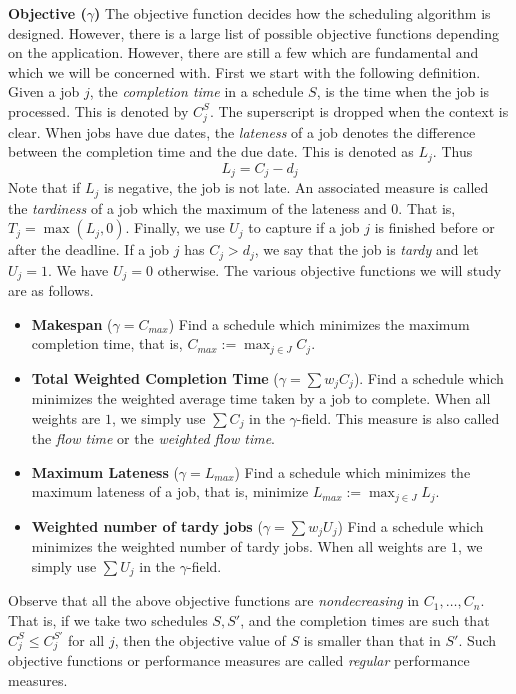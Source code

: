 \documentclass[11pt]{article}
\def\ni{\noindent}
\begin{document}
\ni
{\bf Objective ($\gamma$)} The objective function decides how the scheduling algorithm is designed. However, there is a large list of possible objective functions depending on the application. However, there are still a few which are fundamental and which we will be concerned with. First we start with the following definition. Given a job $j$, the {\em completion time}
in a schedule $S$, is the time when the job is processed. This is denoted by $C^S_j$. The superscript is dropped when the context is clear.
When jobs have due dates, the {\em lateness} of a job denotes the difference between the completion time and the due date. This is denoted as $L_j$. Thus
$$ L_j = C_j - d_j$$
Note that if $L_j$ is negative, the job is not late. An associated measure is called the {\em tardiness} of a job which the maximum of the lateness and $0$. That is, $T_j = \max (L_j, 0)$. Finally, we use $U_j$ to capture if a job $j$ is finished before or after the deadline. If a job $j$ has $C_j > d_j$, we say that the job is {\em tardy} and let $U_j = 1$. We have $U_j = 0$ otherwise. The various objective functions we will study are as follows.

\begin{itemize}
\item[] {\bf Makespan} ($\gamma = C_{max}$) Find a schedule which minimizes the maximum completion time, that is, 
$C_{max} := \max_{j\in J} C_j$.

\item[]{\bf Total Weighted Completion Time} ($\gamma = \sum w_jC_j$). Find a schedule which minimizes the weighted average time taken by a job to complete. When all weights are $1$, we simply use $\sum C_j$ in the $\gamma$-field. This measure is also called the {\em flow time} or the {\em weighted flow time}.

\item[]{\bf Maximum Lateness} ($\gamma = L_{max}$) Find a schedule which minimizes the maximum lateness of a job,
that is, minimize $L_{max} := \max_{j\in J} L_j$.

\item[]{\bf Weighted number of tardy jobs} ($\gamma = \sum w_jU_j$) Find a schedule which minimizes the weighted number of tardy jobs. When all weights are $1$, we simply use $\sum U_j$ in the $\gamma$-field.
\end{itemize}

Observe that all the above objective functions are {\em nondecreasing} in $C_1,\ldots,C_n$. That is, if we take two schedules $S,S'$, and the completion times are such that $C^S_j \le C^{S'}_j$ for all $j$, then the objective value of $S$ is 
smaller than that in $S'$. Such objective functions or performance measures are called {\em regular} performance measures.
\end{document}
